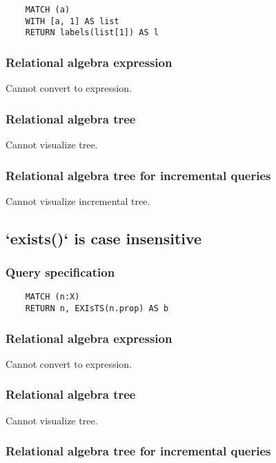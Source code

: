 	\begin{lstlisting}
	MATCH (a)
	WITH [a, 1] AS list
	RETURN labels(list[1]) AS l
	\end{lstlisting}


	\subsubsection*{Relational algebra expression}

	Cannot convert to expression.

	\subsubsection*{Relational algebra tree}

	Cannot visualize tree.

	\subsubsection*{Relational algebra tree for incremental queries}

	Cannot visualize incremental tree.
	\subsection{`exists()` is case insensitive}

	\subsubsection*{Query specification}

	\begin{lstlisting}
	MATCH (n:X)
	RETURN n, EXIsTS(n.prop) AS b
	\end{lstlisting}


	\subsubsection*{Relational algebra expression}

	Cannot convert to expression.

	\subsubsection*{Relational algebra tree}

	Cannot visualize tree.

	\subsubsection*{Relational algebra tree for incremental queries}

